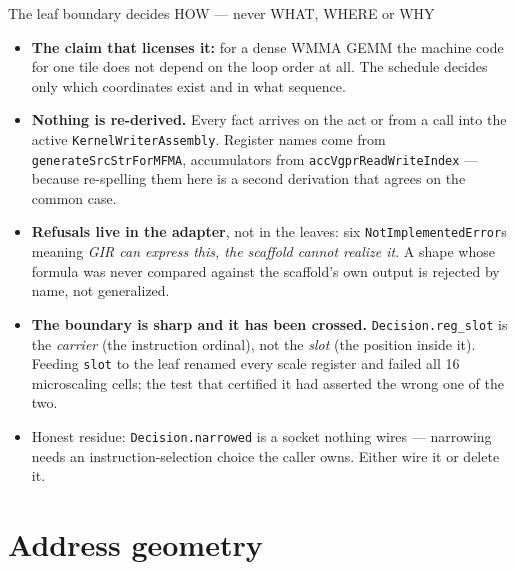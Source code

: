 \documentclass[aspectratio=169,9pt]{beamer}
\newcommand{\tsub}[1]{{\footnotesize\color{gray}#1}}
\newcommand{\key}[1]{\textcolor{acc}{\textbf{#1}}}
\newcommand{\bad}[1]{\textcolor{warn}{\textbf{#1}}}
\begin{document}
\begin{frame}{The leaf boundary decides HOW --- never WHAT, WHERE or WHY}
\vspace{4pt}
\scriptsize
\begin{itemize}\itemsep2pt
  \item \key{The claim that licenses it:} for a dense WMMA GEMM the machine code for one tile does
        not depend on the loop order at all. The schedule decides only which coordinates exist and
        in what sequence.
  \item \key{Nothing is re-derived.} Every fact arrives on the act or from a call into the active
        \texttt{KernelWriterAssembly}. Register names come from
        \texttt{generateSrcStrForMFMA}, accumulators from \texttt{accVgprReadWriteIndex} --- because
        re-spelling them here is a second derivation that agrees on the common case.
  \item \key{Refusals live in the adapter}, not in the leaves: six
        \texttt{NotImplementedError}s meaning \emph{GIR can express this, the scaffold cannot
        realize it}. A shape whose formula was never compared against the scaffold's own output is
        rejected by name, not generalized.
  \item \bad{The boundary is sharp and it has been crossed.} \texttt{Decision.reg\_slot} is the
        \emph{carrier} (the instruction ordinal), not the \emph{slot} (the position inside it).
        Feeding \texttt{slot} to the leaf renamed every scale register and failed all 16
        microscaling cells; the test that certified it had asserted the wrong one of the two.
  \item \tsub{Honest residue: \texttt{Decision.narrowed} is a socket nothing wires --- narrowing
        needs an instruction-selection choice the caller owns. Either wire it or delete it.}
\end{itemize}
\end{frame}

\section{Address geometry}
\end{document}
